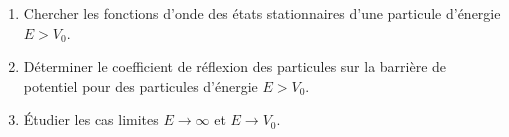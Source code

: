 \documentclass[
  french,
  11pt,
]{article}
\providecommand{\tightlist}{%
  \setlength{\itemsep}{0pt}\setlength{\parskip}{0pt}}
\begin{document}
\begin{enumerate}
\def\labelenumi{\alph{enumi}.}
\tightlist
\item
  Chercher les fonctions d'onde des états stationnaires d'une particule
  d'énergie \(E > V_0\).
\item
  Déterminer le coefficient de réflexion des particules sur la barrière
  de potentiel pour des particules d'énergie \(E > V_0\).
\item
  Étudier les cas limites \(E\to\infty\) et \(E\to V_0\).
\end{enumerate}
\end{document}
